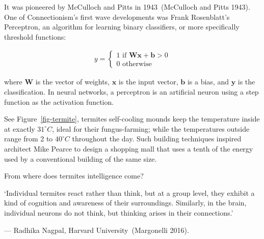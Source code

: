 \documentclass[
  letterpaper,
  12pt,
  british]{tufte-book}
\renewenvironment{quote}{
  \list{}{\leftmargin=3.5cm\topsep=0pt}
  \item\relax\small\itshape
}
{\endlist}
\theoremstyle{plain}
\theoremstyle{plain}
\theoremstyle{definition}
\theoremstyle{remark}
\begin{document}
It was pioneered by McCulloch and Pitts in 1943~(McCulloch and Pitts
1943).
One of Connectionism's first wave developments was Frank Rosenblatt's
Perceptron, an algorithm for learning binary classifiers, or more
specifically threshold functions:

\begin{align}          
     y=
     \begin{cases}
         1 \text{ if } \mathbf{W}\mathbf{x}+ \mathbf{b}> 0\\
         0 \text{ otherwise }
     \end{cases}
 \end{align}

where \(\mathbf{W}\) is the vector of weights, \(\mathbf{x}\) is the
input vector, \(\mathbf{b}\) is a bias, and \(\mathbf{y}\) is the
classification. In neural networks, a perceptron is an artificial neuron
using a step function as the activation function.

See Figure~\ref{fig-termite}, termites self-cooling mounds keep the
temperature inside at exactly \(31^{\circ} C\), ideal for their
fungus-farming; while the temperatures outside range from 2 to
\(40^{\circ} C\) throughout the day. Such building techniques inspired
architect Mike Pearce to design a shopping mall that uses a tenth of the
energy used by a conventional building of the same size.

From where does termites intelligence come?

\begin{quote}
`Individual termites react rather than think, but at a group level, they
exhibit a kind of cognition and awareness of their surroundings.
Similarly, in the brain, individual neurons do not think, but thinking
arises in their connections.'

--- Radhika Nagpal, Harvard University~(Margonelli
2016).
\end{quote}
\end{document}
